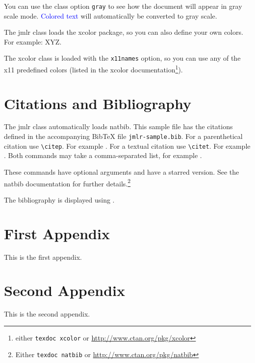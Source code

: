 \documentclass[pmlr]{jmlr}%
\begin{document}
You can use the class option \texttt{gray} to see how the
document will appear in gray scale mode. \textcolor{blue}{Colored
text} will automatically be converted to gray scale.

The \textsf{jmlr} class loads the \textsf{xcolor}
package, so you can also define your own colors. For example:
\ifprint
  {}%
  {}%
\textcolor{myred}{XYZ}.

The \textsf{xcolor} class is loaded with the \texttt{x11names}
option, so you can use any of the x11 predefined colors (listed
in the \textsf{xcolor} documentation\footnote{either 
\texttt{texdoc xcolor} or \url{http://www.ctan.org/pkg/xcolor}}).

\section{Citations and Bibliography}
\label{sec:cite}

The \textsf{jmlr} class automatically loads \textsf{natbib}.
This sample file has the citations defined in the accompanying
BibTeX file \texttt{jmlr-sample.bib}. For a parenthetical
citation use \verb|\citep|. For example
\citep{guyon-elisseeff-03}. For a textual citation use
\verb|\citet|. For example \citet{guyon2007causalreport}.
Both commands may take a comma-separated list, for example
\citet{guyon-elisseeff-03,guyon2007causalreport}.

These commands have optional arguments and have a starred
version. See the \textsf{natbib} documentation for further
details.\footnote{Either \texttt{texdoc natbib} or
\url{http://www.ctan.org/pkg/natbib}}

The bibliography is displayed using \verb||.




\appendix

\section{First Appendix}\label{apd:first}

This is the first appendix.

\section{Second Appendix}\label{apd:second}

This is the second appendix.
\end{document}

